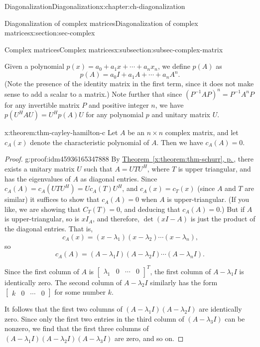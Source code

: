 \documentclass[oneside,10pt,]{book}
\newcommand{\xreffont}{\relax}
\numberwithin{equation}{section}
\newcommand{\bbm}{\begin{bmatrix}}
\newcommand{\ebm}{\end{bmatrix}}
\newcommand{\amp}{&}
\begin{document}
\begin{chapterptx}{Diagonalization}{}{Diagonalization}{}{}{x:chapter:ch-diagonalization}
\begin{sectionptx}{Diagonalization of complex matrices}{}{Diagonalization of complex matrices}{}{}{x:section:sec-complex}
\begin{subsectionptx}{Complex matrices}{}{Complex matrices}{}{}{x:subsection:subsec-complex-matrix}
\par
Given a polynomial \(p(x) = a_0+a_1x+\cdots + a_nx_n\), we define \(p(A)\) as%
\begin{equation*}
p(A) = a_0I+a_1A+\cdots + a_nA^n\text{.}
\end{equation*}
(Note the presence of the identity matrix in the first term, since it does not make sense to add a scalar to a matrix.) Note further that since \((P^{-1}AP)^n = P^{-1}A^nP\) for any invertible matrix \(P\) and positive integer \(n\), we have \(p(U^HAU)=U^Hp(A)U\) for any polynomial \(p\) and unitary matrix \(U\).%
\begin{theorem}{}{}{x:theorem:thm-cayley-hamilton-c}%
Let \(A\) be an \(n\times n\) complex matrix, and let \(c_A(x)\) denote the characteristic polynomial of \(A\). Then we have \(c_A(A)=0\).%
\end{theorem}
\begin{proof}{}{g:proof:idm45936165347888}
By \hyperref[x:theorem:thm-schurr]{Theorem~{\xreffont\ref{x:theorem:thm-schurr}}, p.\,\pageref{x:theorem:thm-schurr}}, there exists a unitary matrix \(U\) such that \(A = UTU^H\), where \(T\) is upper triangular, and has the eigenvalues of \(A\) as diagonal entries. Since \(c_A(A)=c_A(UTU^H)=Uc_A(T)U^H\), and \(c_A(x)=c_T(x)\) (since \(A\) and \(T\) are similar) it suffices to show that \(c_A(A)=0\) when \(A\) is upper-triangular. (If you like, we are showing that \(C_T(T)=0\), and deducing that \(c_A(A)=0\).) But if \(A\) is upper-triangular, so is \(xI_A\), and therefore, \(\det(xI-A)\) is just the product of the diagonal entries. That is,%
\begin{equation*}
c_A(x) = (x-\lambda_1)(x-\lambda_2)\cdots (x-\lambda_n)\text{,}
\end{equation*}
so%
\begin{equation*}
c_A(A) = (A-\lambda_1I)(A-\lambda_2I)\cdots (A-\lambda_nI)\text{.}
\end{equation*}
%
\par
Since the first column of \(A\) is \(\bbm \lambda_1\amp 0 \amp \cdots \amp 0\ebm^T\), the first column of \(A-\lambda_1I\) is identically zero. The second column of \(A-\lambda_2I\) similarly has the form \(\bbm k\amp 0\amp\cdots\amp 0\ebm\) for some number \(k\).%
\par
It follows that the first two columns of \((A-\lambda_1I)(A-\lambda_2I)\) are identically zero. Since only the first two entries in the third column of \((A-\lambda_3I)\) can be nonzero, we find that the first three columns of \((A-\lambda_1I)(A-\lambda_2I)(A-\lambda_3I)\) are zero, and so on.%

\end{proof}
\end{subsectionptx}
\end{sectionptx}
\end{chapterptx}
\end{document}
